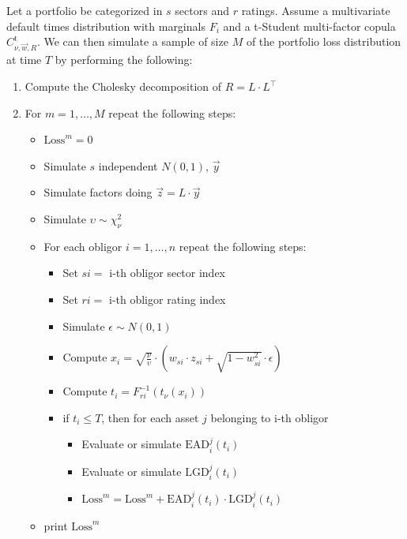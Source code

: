\documentclass[11pt,fleqn]{book} %
\begin{document}
\begin{algorithm}
	\label{alg:pldmc}
	Let a portfolio be categorized in $s$ sectors and $r$ ratings.
	Assume a multivariate default times distribution with marginals $F_i$
	and a t-Student multi-factor copula $C_{\nu,\vec{w},R}^{\text{t}}$.
	We can then simulate a sample of size $M$ of the portfolio loss distribution
	at time $T$ by performing the following:
	\begin{enumerate}
		\item Compute the Cholesky decomposition of $R = L \cdot L^\intercal$
		\item For $m=1,\dots,M$ repeat the following steps:
		\begin{itemize}
			\item $\text{Loss}^m = 0$
			\item Simulate $s$ independent $N(0,1)$, $\vec{y}$
			\item Simulate factors doing $\vec{z} = L \cdot \vec{y}$
			\item Simulate $\upsilon \sim \chi_{\nu}^2$
			\item For each obligor $i=1,\dots,n$ repeat the following steps:
			\begin{itemize}
				\item Set $si = $ i-th obligor sector index
				\item Set $ri = $ i-th obligor rating index
				\item Simulate $\epsilon \sim N(0,1)$
				\item Compute $x_i = \sqrt{\frac{\nu}{\upsilon}} \cdot \left( w_{si} \cdot z_{si} + \sqrt{1-w_{si}^2} \cdot \epsilon \right)$
				\item Compute $t_i = F_{ri}^{-1}\left(t_{\nu}(x_i)\right)$
				\item if $t_i \le T$, then for each asset $j$ belonging to i-th obligor
				\begin{itemize}
					\item Evaluate or simulate $\text{EAD}_i^j(t_i)$
					\item Evaluate or simulate $\text{LGD}_i^j(t_i)$
					\item $\text{Loss}^m = \text{Loss}^m + \text{EAD}_i^j(t_i) \cdot \text{LGD}_i^j(t_i)$
				\end{itemize}
			\end{itemize}
			\item print $\text{Loss}^m$
		\end{itemize}
	\end{enumerate}
\end{algorithm}
\end{document}
